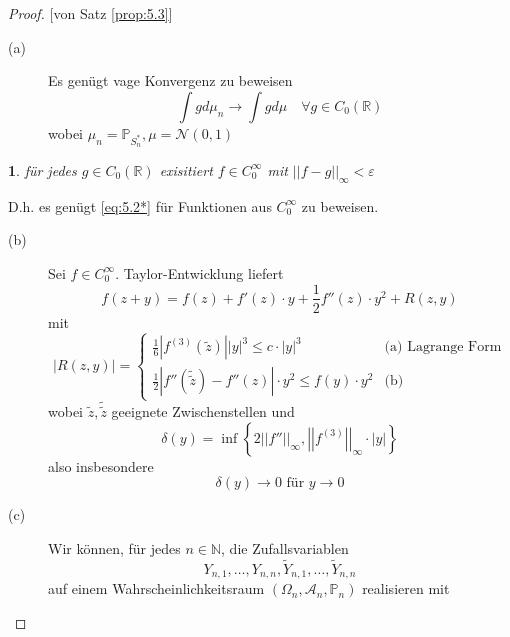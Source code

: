 \documentclass[10pt,a4paper]{report}
\numberwithin{equation}{section}
\numberwithin{figure}{section}
\theoremstyle{plain}
\theoremstyle{definition}
\theoremstyle{remark}
\theoremstyle{plain}
\newtheorem*{fact*}{\protect\factname}
\providecommand{\factname}{Fakt}
\newcommand{\1}{ \mathbb{1} } %
\begin{document}
\begin{proof}
{[}von Satz \ref{prop:5.3}{]}
\begin{description}
\item [{(a)}] Es genügt vage Konvergenz zu beweisen
\begin{equation}
\int gd\mu_{n}\to\int gd\mu\quad\forall g\in C_{0}\left(\mathbb{R}\right)\label{eq:5.2*}
\end{equation}
wobei $\mu_{n}=\mathbb{P}_{S_{n}^{*}},\mu=\mathcal{N}\left(0,1\right)$\end{description}
\begin{fact*}
für jedes $g\in C_{0}\left(\mathbb{R}\right)$ exisitiert $f\in C_{0}^{\infty}$
mit $\left|\left|f-g\right|\right|_{\infty}<\varepsilon$
\end{fact*}

D.h. es genügt \ref{eq:5.2*} für Funktionen aus $C_{0}^{\infty}$
zu beweisen.
\begin{description}
\item [{(b)}] Sei $f\in C_{0}^{\infty}$. Taylor-Entwicklung liefert
\[
f\left(z+y\right)=f\left(z\right)+f'\left(z\right)\cdot y+\frac{1}{2}f''\left(z\right)\cdot y^{2}+R\left(z,y\right)
\]
mit 
\[
\left|R\left(z,y\right)\right|=\begin{cases}
\frac{1}{6}\left|f^{\left(3\right)}\left(\tilde{z}\right)\right|\left|y\right|^{3}\leq c\cdot\left|y\right|^{3} & \mbox{(a) Lagrange Form}\\
\frac{1}{2}\left|f''\left(\tilde{\tilde{z}}\right)-f''\left(z\right)\right|\cdot y^{2}\le f\left(y\right)\cdot y^{2} & \mbox{(b)}
\end{cases}
\]
wobei $\tilde{z},\tilde{\tilde{z}}$ geeignete Zwischenstellen und
\[
\delta\left(y\right)=\inf\left\{ 2\left|\left|f''\right|\right|_{\infty},\left|\left|f^{\left(3\right)}\right|\right|_{\infty}\cdot\left|y\right|\right\} 
\]
also insbesondere 
\[
\delta\left(y\right)\to0\mbox{ für }y\to0
\]

\item [{(c)}] Wir können, für jedes $n\in\mathbb{N}$, die Zufallsvariablen
\[
Y_{n,1},\ldots,Y_{n,n},\tilde{Y}_{n,1},\ldots,\tilde{Y}_{n,n}
\]
auf einem Wahrscheinlichkeitsraum $\left(\Omega_{n},\mathcal{A}_{n},\mathbb{P}_{n}\right)$
realisieren mit 


\end{description}
\end{proof}
\end{document}
